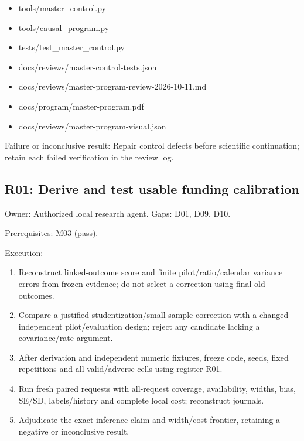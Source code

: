 \documentclass[
  11pt,
  a4paper,
]{article}
\providecommand{\tightlist}{%
  \setlength{\itemsep}{0pt}\setlength{\parskip}{0pt}}
\begin{document}
\begin{itemize}
\tightlist
\item
  tools/master\_control.py
\item
  tools/causal\_program.py
\item
  tests/test\_master\_control.py
\item
  docs/reviews/master-control-tests.json
\item
  docs/reviews/master-program-review-2026-10-11.md
\item
  docs/program/master-program.pdf
\item
  docs/reviews/master-program-visual.json
\end{itemize}

Failure or inconclusive result: Repair control defects before scientific
continuation; retain each failed verification in the review log.

\hypertarget{r01-derive-and-test-usable-funding-calibration}{%
\subsection{R01: Derive and test usable funding
calibration}\label{r01-derive-and-test-usable-funding-calibration}}

Owner: Authorized local research agent. Gaps: D01, D09, D10.

Prerequisites: M03 (pass).

Execution:

\begin{enumerate}
\def\labelenumi{\arabic{enumi}.}
\tightlist
\item
  Reconstruct linked-outcome score and finite pilot/ratio/calendar
  variance errors from frozen evidence; do not select a correction using
  final old outcomes.
\item
  Compare a justified studentization/small-sample correction with a
  changed independent pilot/evaluation design; reject any candidate
  lacking a covariance/rate argument.
\item
  After derivation and independent numeric fixtures, freeze code, seeds,
  fixed repetitions and all valid/adverse cells using register R01.
\item
  Run fresh paired requests with all-request coverage, availability,
  widths, bias, SE/SD, labels/history and complete local cost;
  reconstruct journals.
\item
  Adjudicate the exact inference claim and width/cost frontier,
  retaining a negative or inconclusive result.
\end{enumerate}
\end{document}

